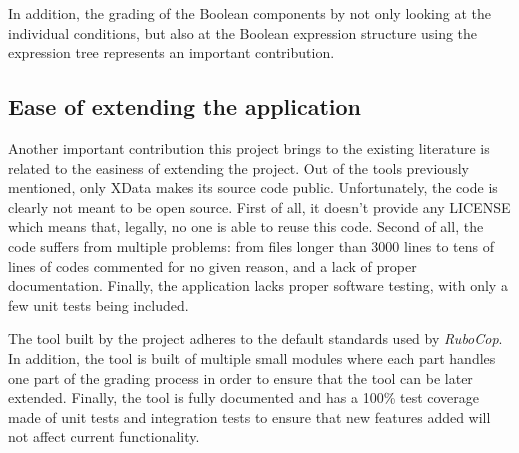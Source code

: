 In addition, the grading of the Boolean components by not only looking at the individual conditions, but also at the Boolean expression structure using the expression tree represents an important contribution.
\subsection{Ease of extending the application}

Another important contribution this project brings to the existing literature is related to the easiness of extending the project. Out of the tools previously mentioned, only XData makes its source code public. Unfortunately, the code is clearly not meant to be open source. First of all, it doesn't provide any LICENSE which means that, legally, no one is able to reuse this code. Second of all, the code suffers from multiple problems: from files longer than 3000 lines to tens of lines of codes commented for no given reason, and a lack of proper documentation. Finally, the application lacks proper software testing, with only a few unit tests being included.

The tool built by the project adheres to the default standards used by \textit{RuboCop}. In addition, the tool is built of multiple small modules where each part handles one part of the grading process in order to ensure that the tool can be later extended. Finally, the tool is fully documented and has a 100\% test coverage made of unit tests and integration tests to ensure that new features added will not affect current functionality.

